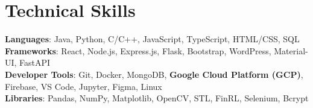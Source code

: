 \documentclass[letterpaper,11pt]{article}
\begin{document}
\section{Technical Skills}
 \begin{itemize}[leftmargin=0.15in, label={}]
    \small{\item{
     \textbf{Languages}{: Java, Python, C/C++, JavaScript, TypeScript, HTML/CSS, SQL} \\
     \textbf{Frameworks}{: React, Node.js, Express.js, Flask, Bootstrap, WordPress, Material-UI, FastAPI} \\
     \textbf{Developer Tools}{: Git, Docker, MongoDB, \textbf{Google Cloud Platform (GCP)}, Firebase, VS Code, Jupyter, Figma, Linux} \\
     \textbf{Libraries}{: Pandas, NumPy, Matplotlib, OpenCV, STL, FinRL, Selenium, Bcrypt}
    }}
 \end{itemize}
\end{document}
